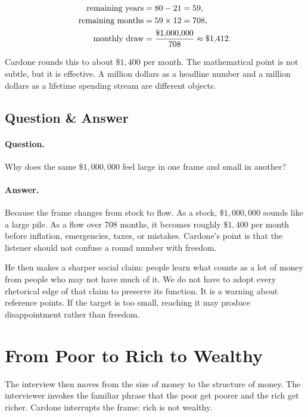 \begin{align}
\hbox{remaining years} &= 80-21=59,\\
\hbox{remaining months} &= 59\times 12=708,\\
\hbox{monthly draw} &= \frac{\$1{,}000{,}000}{708}
\approx \$1{,}412.
\end{align}

Cardone rounds this to about \(\$1{,}400\) per month. The mathematical point is not subtle, but it is effective. A million dollars as a headline number and a million dollars as a lifetime spending stream are different objects.

\subsection{Question \& Answer}

\paragraph{Question.} Why does the same \(\$1{,}000{,}000\) feel large in one frame and small in another?

\paragraph{Answer.} Because the frame changes from stock to flow. As a stock, \(\$1{,}000{,}000\) sounds like a large pile. As a flow over \(708\) months, it becomes roughly \(\$1{,}400\) per month before inflation, emergencies, taxes, or mistakes. Cardone's point is that the listener should not confuse a round number with freedom.

He then makes a sharper social claim: people learn what counts as a lot of money from people who may not have much of it. We do not have to adopt every rhetorical edge of that claim to preserve its function. It is a warning about reference points. If the target is too small, reaching it may produce disappointment rather than freedom.

\section{From Poor to Rich to Wealthy}

The interview then moves from the size of money to the structure of money. The interviewer invokes the familiar phrase that the poor get poorer and the rich get richer. Cardone interrupts the frame: rich is not wealthy.

